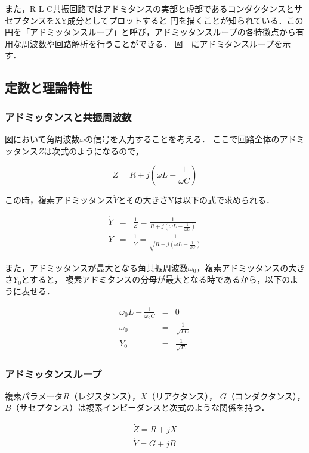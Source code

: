 \documentclass[dvipdfmx,titlepage,a4j]{jsarticle}  %
\begin{document}
また，R-L-C共振回路ではアドミタンスの実部と虚部であるコンダクタンスとサセプタンスをXY成分としてプロットすると
円を描くことが知られている．この円を「アドミッタンスループ」と呼び，アドミッタンスループの各特徴点から有用な周波数や回路解析を行うことができる．
図　にアドミタンスループを示す．

\subsection{定数と理論特性}

\subsubsection{アドミッタンスと共振周波数}
図において角周波数$\omega$の信号を入力することを考える．
ここで回路全体のアドミッタンス$Z$は次式のようになるので，

\begin{equation}
  Z = R + j(\omega L - \frac{1}{\omega C})
\end{equation}

この時，複素アドミッタンス$\dot{Y}$とその大きさYは以下の式で求められる．

\begin{eqnarray}
  \dot{Y} &=& \frac{1}{Z} = \frac{1}{R + j(\omega L - \frac{1}{\omega C})} \\
  Y &=& \frac{1}{\dot{Y}} = \frac{1}{\sqrt{R + j(\omega L - \frac{1}{\omega C})}}
\end{eqnarray}

また，アドミッタンスが最大となる角共振周波数$\omega_0$，複素アドミッタンスの大きさ$Y_0$とすると，
複素アドミタンスの分母が最大となる時であるから，以下のように表せる．

\begin{eqnarray}
  \omega_0 L - \frac{1}{\omega_0 C} &=& 0 \\
  \omega_0 &=& \frac{1}{\sqrt{LC}} \\
  Y_0 &=& \frac{1}{\sqrt{R}}
\end{eqnarray}

\subsubsection{アドミッタンスループ}

複素パラメータ$R$（レジスタンス），$X$（リアクタンス），
$G$（コンダクタンス），$B$（サセプタンス）は複素インピーダンスと次式のような関係を持つ．

\begin{eqnarray}
  \dot{Z} = R + jX \\
  \dot{Y} = G + jB
\end{eqnarray}
\end{document}
